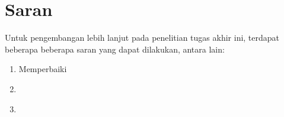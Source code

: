 \section{Saran}
\label{chap:saran}

Untuk pengembangan lebih lanjut pada penelitian tugas akhir ini, terdapat beberapa beberapa saran yang dapat dilakukan, antara lain:

\begin{enumerate}[nolistsep]

  \item Memperbaiki \textcolor{red}{\lipsum[2][1-3]}

  \item \textcolor{red}{\lipsum[2][4-6]}

  \item \textcolor{red}{\lipsum[2][7-10]}

\end{enumerate}
